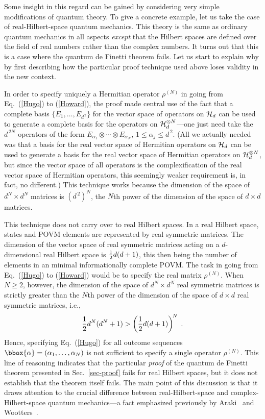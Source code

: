 Some insight in this regard can be gained by considering very
simple modifications of quantum theory.  To give a concrete
example, let us take the case of real-Hilbert-space quantum
mechanics.  This theory is the same as ordinary quantum mechanics
in all aspects {\it except\/} that the Hilbert spaces are defined
over the field of real numbers rather than the complex numbers.
It turns out that this is a case where the quantum de Finetti
theorem fails.  Let us start to explain why by first describing
how the particular proof technique used above loses validity in
the new context.

In order to specify uniquely a Hermitian operator $\rho^{(N)}$ in
going from Eq.~(\ref{Hugo}) to (\ref{Howard}), the proof made
central use of the fact that a complete basis
$\{E_{1},\ldots,E_{d^{\,2}}\}$ for the vector space of operators
on ${\cal H}_d$ can be used to generate a complete basis for the
operators on ${\cal H}_d^{\otimes N}$---one just need take the
$d^{\,2N}$ operators of the form
$E_{\alpha_1}\!\otimes\cdots\otimes E_{\alpha_N}$,
$1\le\alpha_j\le d^{\,2}$.  (All we actually needed was that a
basis for the real vector space of Hermitian operators on ${\cal
H}_d$ can be used to generate a basis for the real vector space of
Hermitian operators on ${\cal H}_d^{\otimes N}$, but since the
vector space of all operators is the complexification of the real
vector space of Hermitian operators, this seemingly weaker
requirement is, in fact, no different.)  This technique works
because the dimension of the space of $d^N\!\times d^N$ matrices
is $(d^{\,2})^N$, the $N$th power of the dimension of the space
of $d\times d$ matrices.

This technique does not carry over to real Hilbert spaces. In a
real Hilbert space, states and POVM elements are represented by
real symmetric matrices.  The dimension of the vector space of
real symmetric matrices acting on a $d$-dimensional real Hilbert
space is ${1\over2}d(d+1)$, this then being the number of elements
in an minimal informationally complete POVM.  The task in going
from Eq.~(\ref{Hugo}) to (\ref{Howard}) would be to specify the
real matrix $\rho^{(N)}$.  When $N\ge2$, however, the dimension of
the space of $d^N\!\times d^N$ real symmetric matrices is strictly
greater than the $N$th power of the dimension of the space of
$d\times d$ real symmetric matrices, i.e.,
\begin{equation}
{1\over2}d^{N}(d^N+1)>\left({1\over2}d(d+1)\right)^{\! N}\;.
\end{equation}
Hence, specifying Eq.~(\ref{Hugo}) for all outcome sequences
$\bbox{\alpha}=(\alpha_1,\ldots,\alpha_N)$ is not sufficient to
specify a single operator $\rho^{(N)}$.  This line of reasoning
indicates that the particular {\it proof\/} of the quantum de
Finetti theorem presented in Sec.~\ref{sec-proof} fails for real
Hilbert spaces, but it does not establish that the theorem itself
fails.  The main point of this discussion is that it draws
attention to the crucial difference between real-Hilbert-space and
complex-Hilbert-space quantum mechanics---a fact emphasized
previously by Araki~\cite{Araki1980} and
Wootters~\cite{Wootters1990}.

